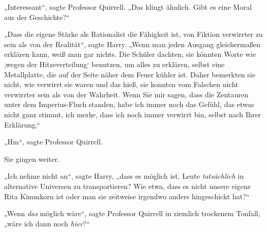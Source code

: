 „Interessant“, sagte Professor Quirrell. „Das klingt ähnlich. Gibt es eine Moral aus der Geschichte?“

„Dass die eigene Stärke als Rationalist die Fähigkeit ist, von Fiktion verwirrter zu sein als von der Realität“, sagte Harry. „Wenn man jeden Ausgang gleichermaßen erklären kann, weiß man gar nichts. Die Schüler dachten, sie könnten Worte wie ‚wegen der Hitzeverteilung‘ benutzen, um alles zu erklären, selbst eine Metallplatte, die auf der Seite näher dem Feuer kühler ist. Daher bemerkten sie nicht, wie verwirrt sie waren und das hieß, sie konnten vom Falschen nicht verwirrter sein als von der Wahrheit. Wenn Sie mir sagen, dass die Zentauren unter dem Imperius-Fluch standen, habe ich immer noch das Gefühl, das etwas nicht ganz stimmt, ich merke, dass ich noch immer verwirrt bin, selbst nach Ihrer Erklärung.“

„Hm“, sagte Professor Quirrell.

Sie gingen weiter.

„Ich nehme nicht an“, sagte Harry, „dass es möglich ist, Leute \emph{tatsächlich} in alternative Universen zu transportieren? Wie etwa, dass es nicht unsere eigene Rita Kimmkorn ist oder man sie zeitweise irgendwo anders hingeschickt hat?“

„Wenn \emph{das} möglich wäre“, sagte Professor Quirrell in ziemlich trockenem Tonfall, „wäre ich dann noch \emph{hier}?“

